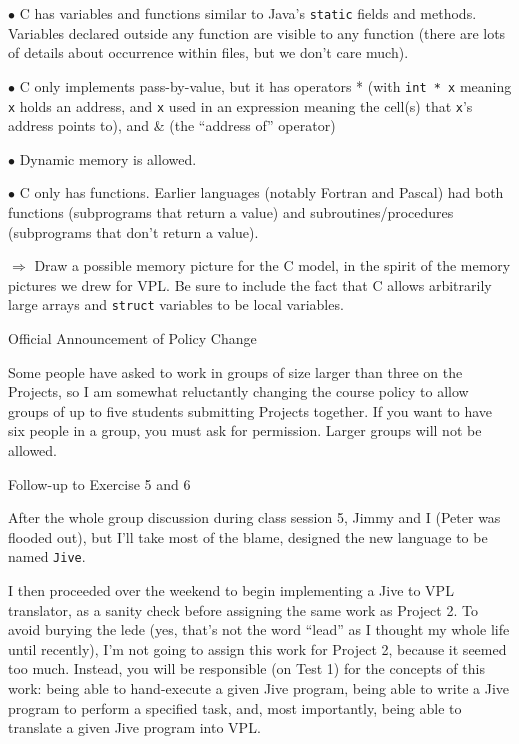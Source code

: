   \item{$\bullet$}  C has variables and functions similar to Java's {\tt static} fields and
  methods.  Variables declared outside any function are visible to any function (there are
  lots of details about occurrence within files, but we don't care much).
  \medskip
  
  \item{$\bullet$} C only implements pass-by-value, but it has operators
  * (with {\tt int * x} meaning {\tt x} holds an address, and {\tt *x} used in an
  expression meaning the cell(s) that {\tt x}'s address points to), and
  \& (the ``address of'' operator)
  \medskip

  \item{$\bullet$} Dynamic memory is  allowed.
  \medskip
 
 \item{$\bullet$}  C only has functions.  Earlier languages (notably Fortran and Pascal) had both
 functions (subprograms that return a value) and subroutines/procedures (subprograms that
 don't return a value).
 \medskip
  \item{$\Rightarrow$\quad} Draw a possible memory picture for the C model, in the spirit of the
  memory pictures we drew for VPL.   Be sure to include the fact that C allows arbitrarily
  large arrays and {\tt struct} variables to be local variables.
  \medskip
  \Out

\vfil\eject

{\bigboldfont Official Announcement of Policy Change}
\medskip

Some people have asked to work in groups of size larger than three on the Projects, so I
am somewhat reluctantly changing the course policy to allow groups of up to five students submitting
Projects together.  If you want to have six people in a group, you must ask for permission.
Larger groups will not be allowed.
\border

{\bigboldfont Follow-up to Exercise 5 and 6}
\medskip

After the whole group discussion during
class session 5, Jimmy and I (Peter was flooded out), but I'll take most of the blame, designed
the new language to be named {\tt Jive}.
\medskip

I then proceeded over the weekend to begin implementing a Jive to VPL translator, as a sanity check before
assigning the same work as Project 2.    To avoid burying the lede (yes, that's not the word ``lead'' as
I thought my whole life until recently), I'm not going to assign this work for Project 2, because it seemed
too much.  Instead, you will be responsible (on Test 1) 
for the concepts of this work:  being able to hand-execute
a given Jive program, being able to write a Jive program to perform a specified task, and, most importantly,
being able to translate a given Jive program into VPL.
\medskip

